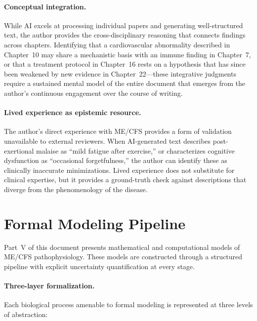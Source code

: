 \paragraph{Conceptual integration.}
While AI excels at processing individual papers and generating well-structured text, the author provides the cross-disciplinary reasoning that connects findings across chapters. Identifying that a cardiovascular abnormality described in Chapter~10 may share a mechanistic basis with an immune finding in Chapter~7, or that a treatment protocol in Chapter~16 rests on a hypothesis that has since been weakened by new evidence in Chapter~22---these integrative judgments require a sustained mental model of the entire document that emerges from the author's continuous engagement over the course of writing.

\paragraph{Lived experience as epistemic resource.}
The author's direct experience with ME/CFS provides a form of validation unavailable to external reviewers. When AI-generated text describes post-exertional malaise as ``mild fatigue after exercise,'' or characterizes cognitive dysfunction as ``occasional forgetfulness,'' the author can identify these as clinically inaccurate minimizations. Lived experience does not substitute for clinical expertise, but it provides a ground-truth check against descriptions that diverge from the phenomenology of the disease.

\section*{Formal Modeling Pipeline}
\label{sec:meth-modeling}

Part~V of this document presents mathematical and computational models of ME/CFS pathophysiology. These models are constructed through a structured pipeline with explicit uncertainty quantification at every stage.

\paragraph{Three-layer formalization.}
Each biological process amenable to formal modeling is represented at three levels of abstraction:

